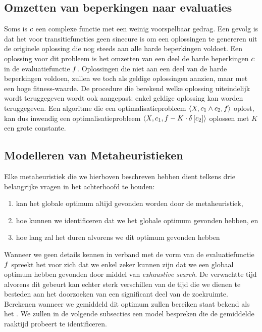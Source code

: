 \subsection{Omzetten van beperkingen naar evaluaties}

Soms is $c$ een complexe functie met een weinig voorspelbaar gedrag. Een gevolg is dat het voor transitiefuncties geen sinecure is om een oplossingen te genereren uit de originele oplossing die nog steeds aan alle harde beperkingen voldoet. Een oplossing voor dit probleem is het omzetten van een deel de harde beperkingen $c$ in de evaluatiefunctie $f$. Oplossingen die niet aan een deel van de harde beperkingen voldoen, zullen we toch als geldige oplossingen aanzien, maar met een hoge fitness-waarde. De procedure die berekend welke oplossing uiteindelijk wordt teruggegeven wordt ook aangepast: enkel geldige oplossing kan worden teruggegeven. Een algoritme die een optimalisatieprobleem $\left\langle X,c_1\wedge c_2,f\right\rangle$ oplost, kan dus inwendig een optimalisatieprobleem $\left\langle X,c_1,f-K\cdot\delta\left[c_2\right]\right\rangle$ oplossen met $K$ een grote constante.\cite{dmathematicsforbioinformatics}

\subsection{Modelleren van Metaheuristieken}

Elke metaheuristiek die we hierboven beschreven hebben dient telkens drie belangrijke vragen in het achterhoofd te houden\cite{DBLP:journals/jc/ShonkwilerV94}:
\begin{enumerate}
 \item kan het globale optimum altijd gevonden worden door de metaheuristiek,
 \item hoe kunnen we identificeren dat we het globale optimum gevonden hebben, en
 \item hoe lang zal het duren alvorens we dit optimum gevonden hebben
\end{enumerate}

Wanneer we geen details kennen in verband met de vorm van de evaluatiefunctie $f$ spreekt het voor zich dat we enkel zeker kunnen zijn dat we een globaal optimum hebben gevonden door middel van \emph{exhaustive search}. De verwachtte tijd alvorens dit gebeurt kan echter sterk verschillen van de tijd die we dienen te besteden aan het doorzoeken van een significant deel van de zoekruimte. Berekenen wanneer we gemiddeld dit optimum zullen bereiken staat bekend als het \cite{DBLP:journals/jc/ShonkwilerV94}. We zullen in de volgende subsecties een model bespreken die de gemiddelde raaktijd probeert te identificeren.

